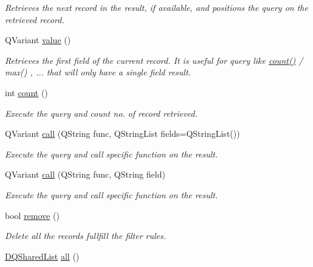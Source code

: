 \begin{DoxyCompactItemize}
\begin{DoxyCompactList}\small\item\em Retrieves the next record in the result, if available, and positions the query on the retrieved record. \item\end{DoxyCompactList}\item 
\hypertarget{classDQSharedQuery_a2e4b80d4ddab5c7476fd5795a7321f0a}{
QVariant \hyperlink{classDQSharedQuery_a2e4b80d4ddab5c7476fd5795a7321f0a}{value} ()}
\label{classDQSharedQuery_a2e4b80d4ddab5c7476fd5795a7321f0a}

\begin{DoxyCompactList}\small\item\em Retrieves the first field of the current record. It is useful for query like \hyperlink{classDQSharedQuery_a371f26bb8cec5fafe81738ecbe899601}{count()} / max() , ... that will only have a single field result. \item\end{DoxyCompactList}\item 
\hypertarget{classDQSharedQuery_a371f26bb8cec5fafe81738ecbe899601}{
int \hyperlink{classDQSharedQuery_a371f26bb8cec5fafe81738ecbe899601}{count} ()}
\label{classDQSharedQuery_a371f26bb8cec5fafe81738ecbe899601}

\begin{DoxyCompactList}\small\item\em Execute the query and count no. of record retrieved. \item\end{DoxyCompactList}\item 
QVariant \hyperlink{classDQSharedQuery_a654c57e67ee37ea4483f749cfdda45ee}{call} (QString func, QStringList fields=QStringList())
\begin{DoxyCompactList}\small\item\em Execute the query and call specific function on the result. \item\end{DoxyCompactList}\item 
QVariant \hyperlink{classDQSharedQuery_a6e4ec97801fba34687bed3f7df331c70}{call} (QString func, QString field)
\begin{DoxyCompactList}\small\item\em Execute the query and call specific function on the result. \item\end{DoxyCompactList}\item 
bool \hyperlink{classDQSharedQuery_afe36230dc5efa50e5ea9456725b5b4b9}{remove} ()
\begin{DoxyCompactList}\small\item\em Delete all the records fullfill the filter rules. \item\end{DoxyCompactList}\item 
\hypertarget{classDQSharedQuery_a5f1f9c78ce1ac9f0416429a14b0f7ed7}{
\hyperlink{classDQSharedList}{DQSharedList} \hyperlink{classDQSharedQuery_a5f1f9c78ce1ac9f0416429a14b0f7ed7}{all} ()}
\label{classDQSharedQuery_a5f1f9c78ce1ac9f0416429a14b0f7ed7}


\end{DoxyCompactItemize}
